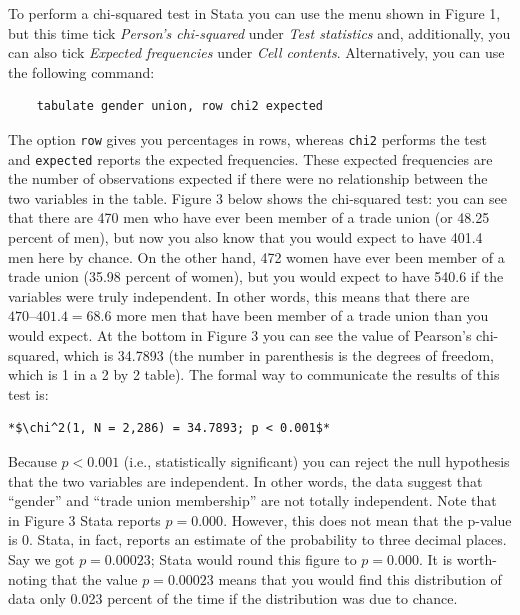 To perform a chi-squared test in Stata you can use the menu shown in Figure 1, but this time tick \textit{Person's chi-squared} under \textit{Test statistics} and, additionally, you can also tick \textit{Expected frequencies} under \textit{Cell contents}. Alternatively, you can use the following command:

\begin{lstlisting}
	tabulate gender union, row chi2 expected
\end{lstlisting}

The option \texttt{row} gives you percentages in rows, whereas \texttt{chi2} performs the test and \texttt{expected} reports the expected frequencies. These expected frequencies are the number of observations expected if there were no relationship between the two variables in the table. Figure 3 below shows the chi-squared test: you can see that there are 470 men who have ever been member of a trade union (or 48.25 percent of men), but now you also know that you would expect to have 401.4 men here by chance. On the other hand, 472 women have ever been member of a trade union (35.98 percent of women), but you would expect to have 540.6 if the variables were truly independent. In other words, this means that there are $470 – 401.4 = 68.6$ more men that have been member of a trade union than you would expect. At the bottom in Figure 3 you can see the value of Pearson's chi-squared, which is 34.7893 (the number in parenthesis is the degrees of freedom, which is 1 in a 2 by 2 table). The formal way to communicate the results of this test is:

\begin{lstlisting}[escapeinside=**]
*$\chi^2(1, N = 2,286) = 34.7893; p < 0.001$*
\end{lstlisting}

Because $p < 0.001$ (i.e., statistically significant) you can reject the null hypothesis that the two variables are independent. In other words, the data suggest that ``gender'' and ``trade union membership'' are not totally independent. Note that in Figure 3 Stata reports $p = 0.000$. However, this does not mean that the p-value is 0. Stata, in fact, reports an estimate of the probability to three decimal places. Say we got $p = 0.00023$; Stata would round this figure to $p = 0.000$. It is worth-noting that the value $p = 0.00023$ means that you would find this distribution of data only 0.023 percent of the time if the distribution was due to chance.

